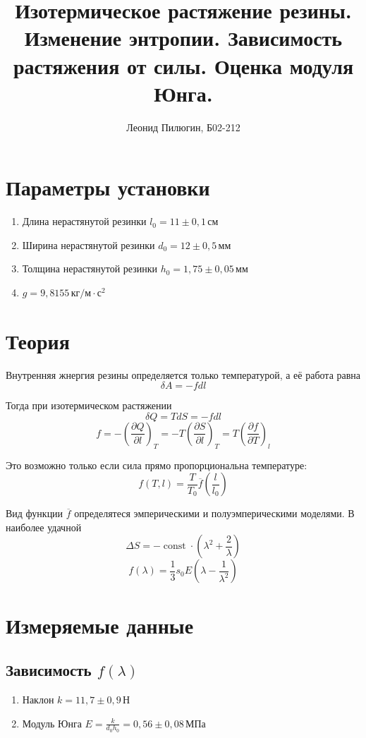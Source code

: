 \documentclass[a4paper, 12pt]{article}
\title{Изотермическое растяжение резины. Изменение энтропии. Зависимость растяжения от силы. Оценка модуля Юнга.}
\author{Леонид Пилюгин, Б02-212}
\DeclareMathOperator{\const}{const}
\begin{document}
    \maketitle

    \section{Параметры установки}
    \begin{enumerate}
        \item Длина нерастянутой резинки $l_0=11\pm 0{,}1\,\text{см}$
        \item Ширина нерастянутой резинки $d_0=12\pm 0{,}5\,\text{мм}$
        \item Толщина нерастянутой резинки $h_0=1{,}75\pm 0{,}05\,\text{мм}$
        \item $g=9{,}8155\,\text{кг}/\text{м}\cdot\text{с}^2$
    \end{enumerate}

    \section{Теория}

    Внутренняя жнергия резины определяется только температурой, а её работа равна
    \[\delta A = -fdl\]

    Тогда при изотермическом растяжении
    \[\delta Q = TdS=-fdl\]
    \[f=-\left(\frac{\partial Q}{\partial l}\right)_T =
    -T\left(\frac{\partial S}{\partial l}\right)_T =
    T\left(\frac{\partial f}{\partial T}\right)_l\]

    Это возможно только если сила прямо пропорциональна температуре:
    \[f(T, l) = \frac{T}{T_0}\overline{f}\left(\frac{l}{l_0}\right)\]

    Вид функции $\overline{f}$ определятеся эмперическими и полуэмперическими моделями.
    В наиболее удачной
    \[\Delta S = -\const\cdot\left(\lambda^2+\frac{2}{\lambda}\right)\]
    \[f(\lambda)=\frac{1}{3}s_0E\left(\lambda-\frac{1}{\lambda^2}\right)\]

    \section{Измеряемые данные}

    \subsection{Зависимость $f(\lambda)$}
    \begin{enumerate}
        \item Наклон $k=11{,}7\pm 0{,}9\,\text{Н}$
        \item Модуль Юнга $E=\frac{k}{d_0h_0}=0{,}56\pm 0{,}08\,\text{МПа}$
    \end{enumerate}
\end{document}
